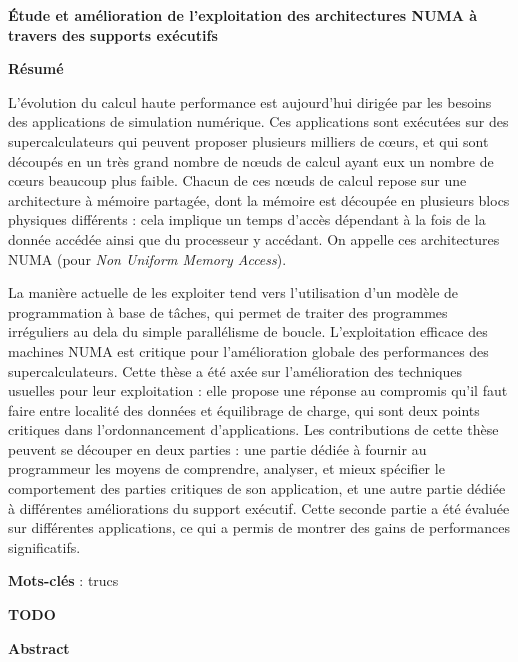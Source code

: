 \MakeUGthesePDG

\clearpage
\ifodd\value{page}\hbox{}\newpage\fi

\begin{center}\textbf{\large Étude et amélioration de l'exploitation des architectures NUMA à travers des supports exécutifs}

\quad

\textbf{Résumé}
\end{center}

L'évolution du calcul haute performance est aujourd'hui dirigée par les besoins des applications de simulation numérique.
Ces applications sont exécutées sur des supercalculateurs qui peuvent proposer plusieurs milliers de cœurs, et qui sont découpés en un très grand nombre de nœuds de calcul ayant eux un nombre de cœurs beaucoup plus faible.
Chacun de ces nœuds de calcul repose sur une architecture à mémoire partagée, dont la mémoire est découpée en plusieurs blocs physiques différents : cela implique un temps d'accès dépendant à la fois de la donnée accédée ainsi que du processeur y accédant.
On appelle ces architectures NUMA (pour \emph{Non Uniform Memory Access}).

La manière actuelle de les exploiter tend vers l'utilisation d'un modèle de programmation à base de tâches, qui permet de traiter des programmes irréguliers au dela du simple parallélisme de boucle.
L'exploitation efficace des machines NUMA est critique pour l'amélioration globale des performances des supercalculateurs.
Cette thèse a été axée sur l'amélioration des techniques usuelles pour leur exploitation : elle propose une réponse au compromis qu'il faut faire entre localité des données et équilibrage de charge, qui sont deux points critiques dans l'ordonnancement d'applications.
Les contributions de cette thèse peuvent se découper en deux parties : une partie dédiée à fournir au programmeur les moyens de comprendre, analyser, et mieux spécifier le comportement des parties critiques de son application, et une autre partie dédiée à différentes améliorations du support exécutif.
Cette seconde partie a été évaluée sur différentes applications, ce qui a permis de montrer des gains de performances significatifs.



\quad

\textbf{Mots-clés} : trucs

\begin{center}\textbf{\large TODO }

\quad

\textbf{Abstract}
\end{center}

